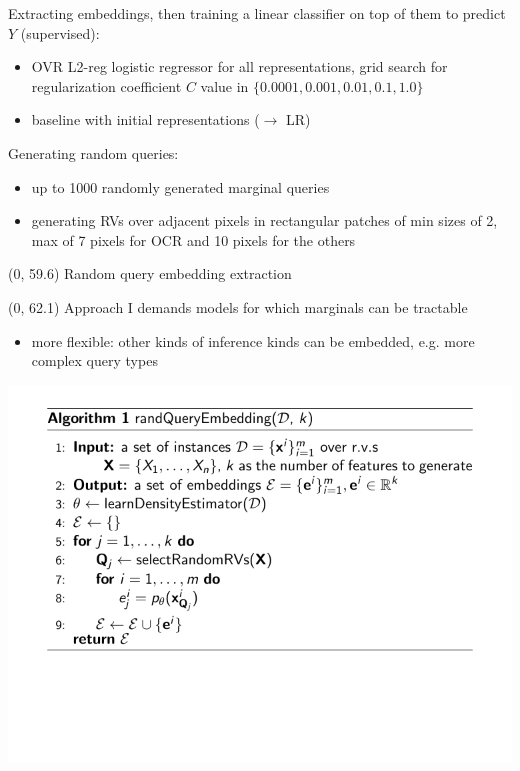 \documentclass[final]{beamer}
\begin{document}
\begin{frame}{}
\begin{textblock}{25.2}
    Extracting embeddings, then training a linear classifier on top of
    them to predict $Y$ (supervised):
    \begin{itemize}
    \item OVR L2-reg logistic regressor for all representations, grid
      search for regularization coefficient $C$ value in $\{0.0001, 0.001, 0.01, 0.1, 1.0\}$
      \item  baseline with initial representations ($\rightarrow$ \textsf{LR})
    \end{itemize}\vspace{15pt}

    
    Generating random queries:
    \begin{itemize}
    \item up to 1000 randomly generated marginal queries
      \item generating RVs over adjacent pixels in rectangular patches of min sizes of 2, max of 7 pixels for
      \textsf{OCR} and 10 pixels for the others
    \end{itemize}
  \end{textblock}

  
  \begin{textblock}{80}(0, 59.6)
    Random query embedding extraction
  \end{textblock}
  
  
    
  \begin{textblock}{25.2}(0, 62.1)
    \small
    Approach I demands models for which marginals can be tractable
    \begin{itemize}
    \item more flexible: other kinds of inference kinds can be embedded,
      e.g. more complex query types~\parencite{Bekker2015}
    \end{itemize}
    \vspace{4pt}
    \begin{center}
      \includegraphics[width=0.9\linewidth]{algo_I}
    \end{center}


\end{textblock}
\end{frame}
\end{document}

